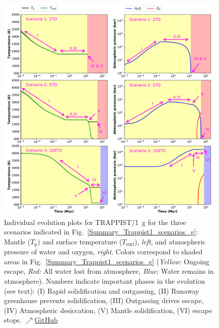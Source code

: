 \documentclass[paper=letterpaper,fontsize=12pt,oneside,twocolumn]{article}
\begin{document}
\begin{figure}[p]
    \centering
    \includegraphics[width=\textwidth]{BarthFig6.pdf}
    \caption{Individual evolution plots for TRAPPIST\=/1~g for the three scenarios indicated in Fig.~\ref{Summary_Trappist1_scenarios_g}: Mantle ($T_\mathrm{p}$) and surface temperature ($T_\mathrm{surf}$), \textit{left}, and atmospheric pressure of water and oxygen, \textit{right}. Colors correspond to shaded areas in Fig.~\ref{Summary_Trappist1_scenarios_g} (\textit{Yellow:} Ongoing escape, \textit{Red:} All water lost from atmosphere, \textit{Blue:} Water remains in atmosphere). Numbers indicate important phases in the evolution (see text): (I) Rapid solidification and outgassing, (II) Runaway greenhouse prevents solidification, (III) Outgassing drives escape, (IV) Atmospheric desiccation, (V) Mantle solidification, (VI)  escape stops.
    \href{https://github.com/pbfeu/Trappist1_MagmOc/tree/public/Fig_Trappist1g_scenarios}{$\nearrow$GitHub}
    }
    \label{Plot_TR1_scenarios_evolution}%
\end{figure}
\end{document}
